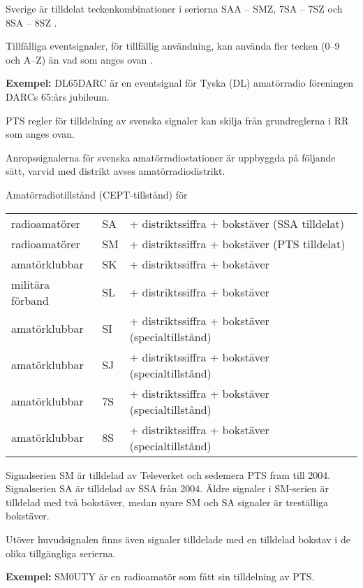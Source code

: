 Sverige är tilldelat teckenkombinationer i serierna SAA -- SMZ, 7SA -- 7SZ och
8SA -- 8SZ \cite[Appendix 42]{ITU-RR}.

Tillfälliga eventsignaler, för tillfällig användning, kan använda fler tecken
(0--9 och A--Z) än vad som anges ovan \cite[§19.68A]{ITU-RR}.

\textbf{Exempel:} DL65DARC är en eventsignal för Tyska (DL) amatörradio
föreningen DARCs 65:års jubileum.

PTS regler för tilldelning av svenska signaler kan skilja från grundreglerna
i RR som anges ovan.

Anropssignalerna för svenska amatörradiostationer är uppbyggda på följande
sätt, varvid med distrikt avses amatörradiodistrikt.

Amatörradiotillstånd (CEPT-tillstånd) för

\begin{tabular}{lll}
radioamatörer & SA & + distriktssiffra + bokstäver (SSA tilldelat) \\
radioamatörer & SM & + distriktssiffra + bokstäver (PTS tilldelat) \\
amatörklubbar & SK & + distriktssiffra + bokstäver \\
militära förband & SL & + distriktssiffra + bokstäver \\
amatörklubbar & SI & + distriktssiffra + bokstäver (specialtillstånd) \\
amatörklubbar & SJ & + distriktssiffra + bokstäver (specialtillstånd) \\
amatörklubbar & 7S & + distriktssiffra + bokstäver (specialtillstånd) \\
amatörklubbar & 8S & + distriktssiffra + bokstäver (specialtillstånd) \\
\end{tabular}

Signalserien SM är tilldelad av Televerket och sedemera PTS fram till 2004.
Signalserien SA är tilldelad av SSA från 2004. Äldre signaler i SM-serien är
tilldelad med två bokstäver, medan nyare SM och SA signaler är treställiga
bokstäver.

Utöver huvudsignalen finns även signaler tilldelade med en tilldelad
bokstav i de olika tillgängliga serierna.

\textbf{Exempel:} SM0UTY är en radioamatör som fått sin tilldelning av PTS.

